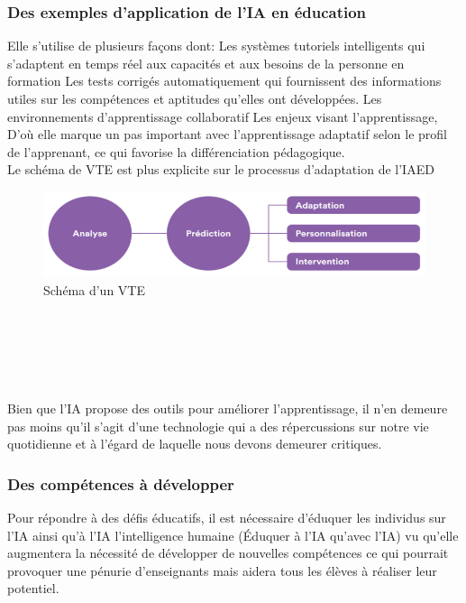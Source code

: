 \subsubsection{Des exemples d'application de l'IA en éducation}

Elle s’utilise de plusieurs façons dont:  
Les systèmes tutoriels intelligents qui s’adaptent en temps réel aux capacités et aux besoins de la personne en formation
Les tests corrigés automatiquement qui fournissent des informations utiles sur les compétences et aptitudes qu’elles ont développées.
Les environnements d’apprentissage collaboratif 
Les enjeux visant l’apprentissage, 
D’où elle marque un pas important avec l’apprentissage adaptatif selon le profil de l’apprenant, ce qui favorise la différenciation pédagogique.  \\ 
Le schéma de VTE est plus explicite sur le processus d'adaptation de l’IAED  
	\begin{figure}[hbtp]
	\centering
	\includegraphics[scale=0.7]{../img/VTE.png}
	\caption{Schéma d'un VTE}
	\end{figure} 
	\\
	\\
	\\
	\\
	\\
	
	Bien que l’IA propose des outils pour améliorer l’apprentissage, il n’en demeure pas moins qu’il s’agit d’une technologie qui a des répercussions sur notre vie quotidienne et à l’égard de laquelle nous devons demeurer critiques.\\

\subsubsection{Des compétences à développer}
Pour répondre à des défis éducatifs, il est nécessaire d’éduquer les individus sur l’IA ainsi qu’à l’IA l’intelligence humaine (Éduquer à l’IA qu’avec l’IA) vu qu’elle augmentera la nécessité de développer de nouvelles compétences ce qui pourrait provoquer une pénurie d’enseignants mais aidera tous les élèves à réaliser leur potentiel.

